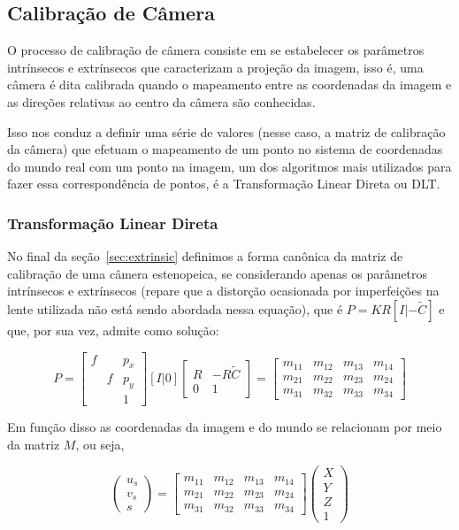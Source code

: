 \documentclass[ecp,tc]{iiufrgs}
\begin{document}
\subsection{Calibração de Câmera}


O processo de calibração de câmera consiste em se estabelecer os parâmetros intrínsecos e extrínsecos que caracterizam a projeção da imagem, isso é, uma câmera é dita calibrada quando o mapeamento entre as coordenadas da imagem e as direções  relativas ao centro da câmera são conhecidas.

Isso nos conduz a definir uma série de valores (nesse caso, a matriz de calibração da câmera) que efetuam o mapeamento de um ponto no sistema de coordenadas do mundo real com um ponto na imagem, um dos algoritmos mais utilizados para fazer essa correspondência de pontos, é a Transformação Linear Direta ou DLT.

\subsubsection{Transformação Linear Direta}

No final da seção~\ref{sec:extrinsic} definimos a forma canônica da matriz de calibração de uma câmera estenopeica, se considerando apenas os parâmetros intrínsecos e extrínsecos (repare que a distorção ocasionada por imperfeições na lente utilizada não está sendo abordada nessa equação), que é $ P = KR[I|-\widetilde{C}] $ e que, por sua vez, admite como solução:

\[
P = \begin{bmatrix} f & & p_x \\ & f & p_y \\ & & 1 \end{bmatrix} [I|0] 
\begin{bmatrix} R & -R\widetilde{C} \\ 0 & 1 \end{bmatrix} = 
\begin{bmatrix} m_{11} & m_{12} & m_{13} & m_{14} \\ m_{21} & m_{22} & m_{23} & m_{24} \\ m_{31} & m_{32} & m_{33} & m_{34} \end{bmatrix}
\]

Em função disso as coordenadas da imagem e do mundo se relacionam por meio da matriz $ M $, ou seja,

\[
\begin{pmatrix} u_s \\ v_s \\ s \end{pmatrix} = \begin{bmatrix} m_{11} & m_{12} & m_{13} & m_{14} \\ m_{21} & m_{22} & m_{23} & m_{24} \\ m_{31} & m_{32} & m_{33} & m_{34} \end{bmatrix} \begin{pmatrix} X \\ Y \\ Z \\ 1 \end{pmatrix}
\]
\end{document}
